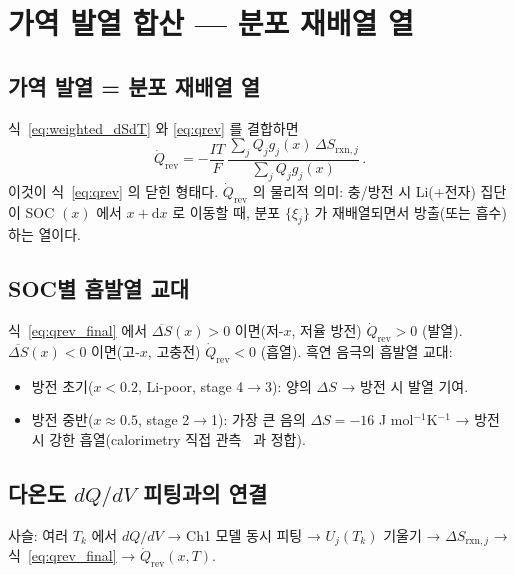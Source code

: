 \documentclass[11pt,a4paper]{article}
\newcommand{\dd}{\mathrm{d}}
\newcommand{\rxn}{\mathrm{rxn}}
\newcommand{\rev}{\mathrm{rev}}
\begin{document}
\section{가역 발열 합산 — 분포 재배열 열}\label{sec:qrev_synthesis}

\subsection{가역 발열 = 분포 재배열 열}

식~\eqref{eq:weighted_dSdT} 와 \eqref{eq:qrev} 를 결합하면
\begin{equation}
  \boxed{\;
  \dot Q_\rev = -\frac{IT}{F}\,
  \frac{\sum_j Q_j g_j(x)\,\Delta S_{\rxn,j}}{\sum_j Q_j g_j(x)}\,.
  \;}
  \label{eq:qrev_final}
\end{equation}
이것이 식~\eqref{eq:qrev} 의 닫힌 형태다. $\dot Q_\rev$ 의 물리적 의미:
충/방전 시 Li(+전자) 집단이 SOC $(x)$ 에서 $x+\dd x$ 로 이동할 때,
분포 $\{\xi_j\}$ 가 재배열되면서 방출(또는 흡수)하는 열이다.

\subsection{SOC별 흡발열 교대}

식~\eqref{eq:qrev_final} 에서 $\overline{\Delta S}(x)>0$ 이면(저-$x$, 저율 방전)
$\dot Q_\rev>0$ (발열). $\overline{\Delta S}(x)<0$ 이면(고-$x$, 고충전) $\dot Q_\rev<0$ (흡열).
흑연 음극의 흡발열 교대:

\begin{itemize}[leftmargin=1.4em,itemsep=2pt]
\item 방전 초기($x<0.2$, Li-poor, stage 4$\to$3): 양의 $\Delta S$ → 방전 시 발열 기여.
\item 방전 중반($x\approx0.5$, stage 2$\to$1): 가장 큰 음의 $\Delta S=-16$ J mol$^{-1}$K$^{-1}$
  → 방전 시 강한 흡열(calorimetry 직접 관측~\cite{standardised2024} 과 정합).
\end{itemize}

\subsection{다온도 $dQ/dV$ 피팅과의 연결}

사슬: 여러 $T_k$ 에서 $dQ/dV$ → Ch1 모델 동시 피팅 → $U_j(T_k)$ 기울기 →
$\Delta S_{\rxn,j}$ → 식~\eqref{eq:qrev_final} → $\dot Q_\rev(x,T)$.
\end{document}

